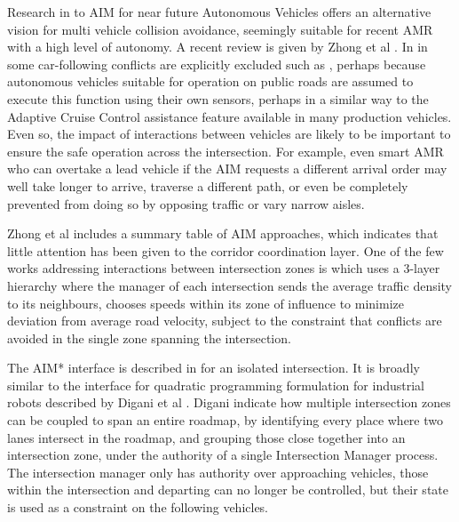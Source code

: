 \documentclass[runningheads]{llncs}
\begin{document}
Research in to AIM for near future Autonomous Vehicles offers an alternative vision for multi vehicle collision avoidance, seemingly suitable for recent AMR with a high level of autonomy. A recent review is given by Zhong et al \cite{Zhong2020}. In in some car-following conflicts are explicitly excluded such as \cite{Yao2020}, perhaps because autonomous vehicles suitable for operation on public roads are assumed to execute this function using their own sensors, perhaps in a similar way to the Adaptive Cruise Control assistance feature available in many production vehicles. Even so, the impact of interactions between vehicles are likely to be important to ensure the safe operation across the intersection. For example, even smart AMR who can overtake a lead vehicle if the AIM requests a different arrival order may well take longer to arrive, traverse a different path, or even be completely prevented from doing so by opposing traffic or vary narrow aisles. 

Zhong et al \cite{Zhong2020} includes a summary table of AIM approaches, which indicates that little attention has been given to the corridor coordination layer.  One of the few works addressing interactions between intersection zones is \cite{Du2018} which uses a 3-layer hierarchy where the manager of each intersection sends the average traffic density to its neighbours, chooses speeds within its zone of influence to minimize deviation from average road velocity, subject to the constraint that conflicts are avoided in the single zone spanning the intersection. 

The AIM* interface is described in \cite{Levin2017} for an isolated intersection. It is broadly similar to the interface for quadratic programming formulation for industrial robots described by Digani et al \cite{Digani2019}. Digani indicate how multiple intersection zones can be coupled to span an entire roadmap, by identifying every place where two lanes intersect in the roadmap, and grouping those close together into an intersection zone, under the authority of a single Intersection Manager process. The intersection manager only has authority over approaching vehicles, those within the intersection and departing can no longer be controlled, but their state is used as a constraint on the following vehicles. 
\end{document}
